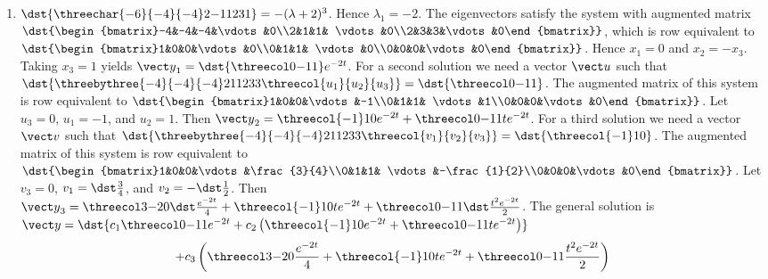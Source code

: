 \documentclass[openany]{book}
\newenvironment{sectionSolutions}{
 \begin{enumerate}[item-label={\thesection.\arabic{enumi}.}]
}{
 \end{enumerate}
}
\begin{document}
\begin{sectionSolutions}
\item
$\dst{\threechar{-6}{-4}{-4}2{-1}1231}
=-(\lambda+2)^3$.
Hence $\lambda_1=-2$.
The eigenvectors
 satisfy the system with  augmented matrix
$\dst{\begin{bmatrix}-4&-4&-4&\vdots&0\\2&1&1&
\vdots&0\\2&3&3&\vdots&0\end{bmatrix}}$,
which is row equivalent to
$\dst{\begin{bmatrix}1&0&0&\vdots&0\\0&1&1&
\vdots&0\\0&0&0&\vdots&0\end{bmatrix}}$.
Hence  $x_1=0$ and $x_2=-x_3$.  Taking $x_3=1$
yields
${\vect y}_1=\dst{\threecol0{-1}1}e^{-2t}$.
For a second solution we need a vector ${\vect u}$ such that
$\dst{\threebythree{-4}{-4}{-4}211233\threecol{u_1}{u_2}{u_3}}
=\dst{\threecol0{-1}1}$.
The augmented matrix of this system is row equivalent to
$\dst{\begin{bmatrix}1&0&0&\vdots&-1\\0&1&1&
\vdots&1\\0&0&0&\vdots&0\end{bmatrix}}$.
Let $u_3=0$, $u_1=-1$, and $u_2=1$. Then
${\vect y}_2=\threecol{{-1}}10e^{-2t}+\threecol0{-1}1te^{-2t}$.
For a third solution we need a vector ${\vect v}$ such that
$\dst{\threebythree{-4}{-4}{-4}211233\threecol{v_1}{v_2}{v_3}}
=\dst{\threecol{-1}10}$.
The augmented matrix of this system is row equivalent to
$\dst{\begin{bmatrix}1&0&0&\vdots&\frac{3}{4}\\0&1&1&
\vdots&-\frac{1}{2}\\0&0&0&\vdots&0\end{bmatrix}}$.
Let $v_3=0$, $v_1=\dst\frac{3}{4}$, and $v_2=-\dst\frac{1}{2}$. Then
${\vect y}_3= \threecol3{-2}0\dst\frac{e^{-2t}}{4}+\threecol{-1}10t
e^{-2t}+\threecol0{-1}1\dst\frac{t^2e^{-2t}}{2}$.
The general solution is
${\vect y}=\dst{c_1\threecol0{-1}1e^{-2t}+
c_2\left(\threecol{{-1}}10e^{-2t}+\threecol0{-1}1te^{-2t}\right)}$
\[+c_3\left(\threecol3{-2}0\frac{e^{-2t}}{4}+\threecol{-1}10t
e^{-2t}+\threecol0{-1}1\frac{t^2e^{-2t}}{2}\right)\]



\end{sectionSolutions}
\end{document}
